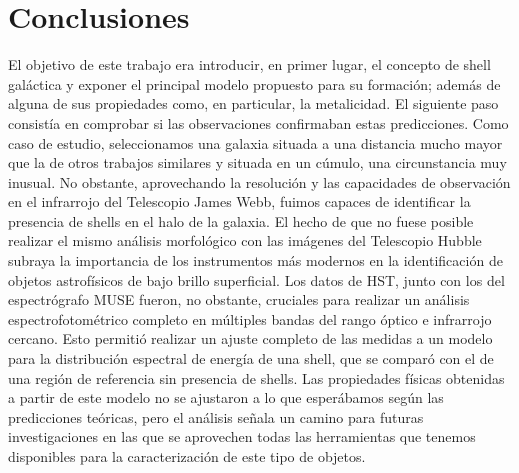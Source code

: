 \section{Conclusiones} \label{sec:conclusiones}
El objetivo de este trabajo era introducir, en primer lugar, el concepto de shell galáctica y exponer el principal modelo propuesto para su formación; además de alguna de sus propiedades como, en particular, la metalicidad. El siguiente paso consistía en comprobar si las observaciones confirmaban estas predicciones. Como caso de estudio, seleccionamos una galaxia situada a una distancia mucho mayor que la de otros trabajos similares y situada en un cúmulo, una circunstancia muy inusual. No obstante, aprovechando la resolución y las capacidades de observación en el infrarrojo del Telescopio James Webb, fuimos capaces de identificar la presencia de shells en el halo de la galaxia. El hecho de que no fuese posible realizar el mismo análisis morfológico con las imágenes del Telescopio Hubble subraya la importancia de los instrumentos más modernos en la identificación de objetos astrofísicos de bajo brillo superficial. Los datos de HST, junto con los del espectrógrafo MUSE fueron, no obstante, cruciales para realizar un análisis espectrofotométrico completo en múltiples bandas del rango óptico e infrarrojo cercano. Esto permitió realizar un ajuste completo de las medidas a un modelo para la distribución espectral de energía de una shell, que se comparó con el de una región de referencia sin presencia de shells. Las propiedades físicas obtenidas a partir de este modelo no se ajustaron a lo que esperábamos según las predicciones teóricas, pero el análisis señala un camino para futuras investigaciones en las que se aprovechen todas las herramientas que tenemos disponibles para la caracterización de este tipo de objetos.